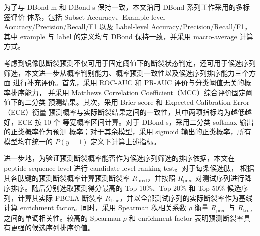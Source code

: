 %
%
%

为了与 DBond-m 和 DBond-s 保持一致，本文沿用 DBond 系列工作采用的多标签评价
体系，包括 Subset Accuracy、Example-level Accuracy/Precision/Recall/F1 以及
Label-level Accuracy/Precision/Recall/F1，其中 example 与 label 的定义均与
DBond 保持一致，并采用 macro-average 计算方式。

考虑到镜像肽断裂预测不仅可用于固定阈值下的断裂状态判定，还可用于候选序列
筛选，本文进一步从概率判别能力、概率预测一致性以及候选序列排序能力三个方面
进行补充评价。首先，采用 ROC-AUC 和 PR-AUC 评价与分类阈值无关的概率排序能力，
并采用 Matthews Correlation Coefficient（MCC）综合评价固定阈值下的二分类
预测结果。其次，采用 Brier score 和 Expected Calibration Error（ECE）衡量
预测概率与实际断裂结果之间的一致性，其中两项指标均为越低越好，ECE 按 10 个
等宽概率区间计算。对于 DBond-s，采用二分类 softmax 输出的正类概率作为预测
概率；对于其余模型，采用 sigmoid 输出的正类概率，所有模型均在统一的
$P(y=1)$ 定义下计算上述指标。

进一步地，为验证预测断裂概率能否作为候选序列筛选的排序依据，本文在
peptide-sequence level 进行 candidate-level ranking test。对于每条候选肽，
根据其各肽键的预测断裂概率计算预测断裂率 $R_{\text{pred}}$，并按照
$R_{\text{pred}}$ 对测试序列进行降序排序。随后分别选取预测得分最高的
Top 10\%、Top 20\% 和 Top 50\% 候选序列，计算其实际 PBCLA 断裂率
$R_{\text{true}}$，并以全部测试序列的实际断裂率作为基线计算 enrichment
factor。同时，采用 Spearman 秩相关系数 $\rho$ 衡量 $R_{\text{pred}}$ 与
$R_{\text{true}}$ 之间的单调相关性。较高的 Spearman $\rho$ 和 enrichment
factor 表明预测断裂率具有更强的候选序列排序价值。

